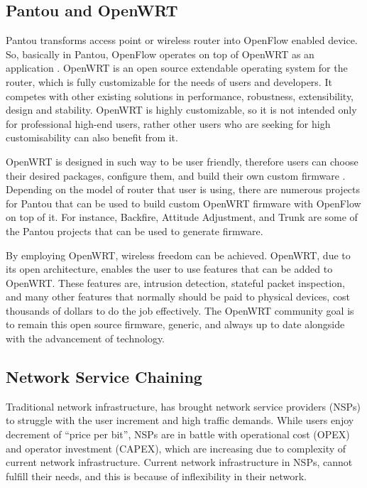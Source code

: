 \documentclass[english]{tktltiki2}
\theoremstyle{definition}
\theoremstyle{remark}
\begin{document}
\subsection{Pantou and OpenWRT}

Pantou transforms access point or wireless router into OpenFlow enabled device. So, basically in Pantou, OpenFlow operates on top of OpenWRT as an application \cite{Yia04}. OpenWRT is an open source extendable operating system for the router, which is fully customizable for the needs of users and developers. It competes with other existing solutions in performance, robustness, extensibility, design and stability. OpenWRT is highly customizable, so it is not intended only for professional high-end users, rather other users who are seeking for high customisability can also benefit from it.  \cite{Lor14}

OpenWRT is designed in such way to be user friendly, therefore users can choose their desired packages, configure them, and build their own custom firmware \cite{Lor14}. Depending on the model of router that user is using, there are numerous projects for Pantou that can be used to build custom OpenWRT firmware with OpenFlow on top of it. For instance, Backfire, Attitude Adjustment, and Trunk are some of the Pantou projects that can be used to generate firmware. \cite{Sve14}

By employing OpenWRT, wireless freedom can be achieved. OpenWRT, due to its open architecture, enables the user to use features that can be added to OpenWRT. These features are, intrusion detection, stateful packet inspection, and many other features that normally should be paid to physical devices, cost thousands of dollars to do the job effectively. The OpenWRT community goal is to remain this open source firmware, generic, and always up to date alongside with the advancement of technology. 

\subsection{Network Service Chaining}

Traditional network infrastructure, has brought network service providers (NSPs) to struggle with the user increment and high traffic demands. While users enjoy decrement of “price per bit”, NSPs are in battle with operational cost (OPEX) and operator investment (CAPEX), which are increasing due to complexity of current network infrastructure. Current network infrastructure in NSPs, cannot fulfill their needs, and this is because of inflexibility in their network. \cite{Wol13}
\end{document}

